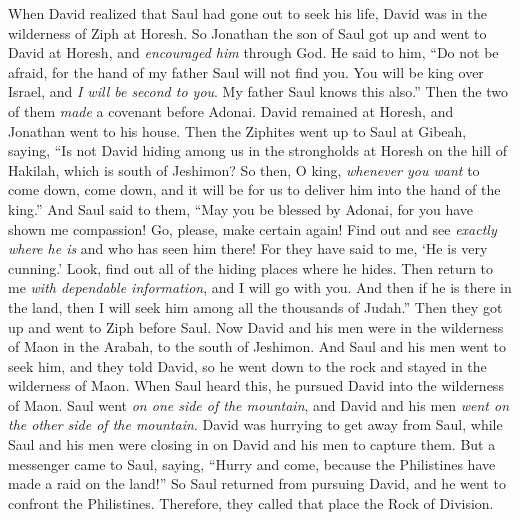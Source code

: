 \begin{biblechapter}
\verse When David realized that Saul had gone out to seek his life, David was in the wilderness of Ziph at Horesh.
\verse So Jonathan the son of Saul got up and went to David at Horesh, and \textit{encouraged him} through God.
\verse He said to him, “Do not be afraid, for the hand of my father Saul will not find you. You will be king over Israel, and \textit{I will be second to you}. My father Saul knows this also.”
\verse Then the two of them \textit{made} a covenant before Adonai. David remained at Horesh, and Jonathan went to his house.
\verse Then the Ziphites went up to Saul at Gibeah, saying, “Is not David hiding among us in the strongholds at Horesh on the hill of Hakilah, which is south of Jeshimon?
\verse So then, O king, \textit{whenever you want} to come down, come down, and it will be for us to deliver him into the hand of the king.”
\verse And Saul said to them, “May you be blessed by Adonai, for you have shown me compassion!
\verse Go, please, make certain again! Find out and see \textit{exactly where he is} and who has seen him there! For they have said to me, ‘He is very cunning.’
\verse Look, find out all of the hiding places where he hides. Then return to me \textit{with dependable information}, and I will go with you. And then if he is there in the land, then I will seek him among all the thousands of Judah.”
\verse Then they got up and went to Ziph before Saul.
\verse Now David and his men were in the wilderness of Maon in the Arabah, to the south of Jeshimon.
\verse And Saul and his men went to seek him, and they told David, so he went down to the rock and stayed in the wilderness of Maon. When Saul heard this, he pursued David into the wilderness of Maon.
\verse Saul went \textit{on one side of the mountain}, and David and his men \textit{went on the other side of the mountain}. David was hurrying to get away from Saul, while Saul and his men were closing in on David and his men to capture them.
\verse But a messenger came to Saul, saying, “Hurry and come, because the Philistines have made a raid on the land!”
\verse So Saul returned from pursuing David, and he went to confront the Philistines. Therefore, they called that place the Rock of Division.
\end{biblechapter}

